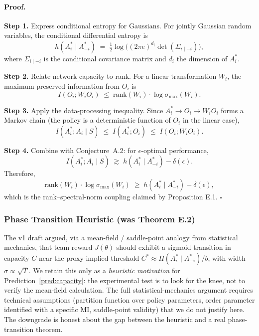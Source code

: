 \documentclass[10pt, letterpaper]{article}
\begin{document}
\paragraph{Proof.}

\textbf{Step 1.} Express conditional entropy for Gaussians. For jointly Gaussian random variables, the conditional differential entropy is
\[h(A_i^* \mid A_{-i}^*) \;=\; \tfrac{1}{2} \log\bigl((2\pi e)^{d_i} \det(\Sigma_{i\mid -i})\bigr),\]
where $\Sigma_{i\mid -i}$ is the conditional covariance matrix and $d_i$ the dimension of $A_i^*$.

\textbf{Step 2.} Relate network capacity to rank. For a linear transformation $W_i$, the maximum preserved information from $O_i$ is
\[I(O_i; W_i O_i) \;\leq\; \mathrm{rank}(W_i) \cdot \log \sigma_{\max}(W_i).\]

\textbf{Step 3.} Apply the data-processing inequality. Since $A_i^* \to O_i \to W_i O_i$ forms a Markov chain (the policy is a deterministic function of $O_i$ in the linear case),
\[I(A_i^*; A_i \mid S) \;\leq\; I(A_i^*; O_i) \;\leq\; I(O_i; W_i O_i).\]

\textbf{Step 4.} Combine with Conjecture~A.2: for $\epsilon$-optimal performance,
\[I(A_i^*; A_i \mid S) \;\gtrsim\; h(A_i^* \mid A_{-i}^*) - \delta(\epsilon).\]
Therefore,
\[\mathrm{rank}(W_i) \cdot \log \sigma_{\max}(W_i) \;\geq\; h(A_i^* \mid A_{-i}^*) - \delta(\epsilon),\]
which is the rank--spectral-norm coupling claimed by Proposition E.1. $\square$

\subsubsection{Phase Transition Heuristic (was Theorem E.2)}

The v1 draft argued, via a mean-field / saddle-point analogy from statistical mechanics, that team reward $J(\theta)$ should exhibit a sigmoid transition in capacity $C$ near the proxy-implied threshold $C^* \approx H(A_i^*\mid A_{-i}^*)/b$, with width $\sigma \propto \sqrt{T}$. We retain this only as a \emph{heuristic motivation} for Prediction~\ref{pred:capacity}: the experimental test is to look for the knee, not to verify the mean-field calculation. The full statistical-mechanics argument requires technical assumptions (partition function over policy parameters, order parameter identified with a specific MI, saddle-point validity) that we do not justify here. The downgrade is honest about the gap between the heuristic and a real phase-transition theorem.
\end{document}
